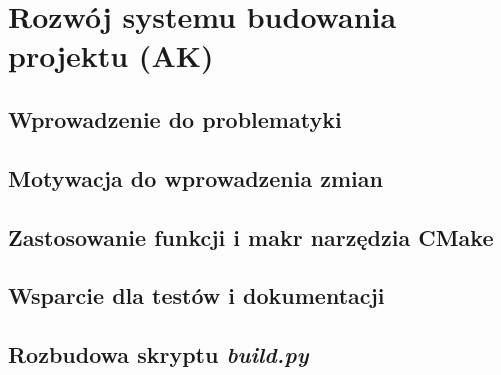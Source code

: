 \clearpage
\section{Rozwój systemu budowania projektu (AK)}
\label{ch:building_project}

\subsection{Wprowadzenie do problematyki}

\subsection{Motywacja do wprowadzenia zmian}

\subsection{Zastosowanie funkcji i makr narzędzia CMake}

\subsection{Wsparcie dla testów i dokumentacji}

\subsection{Rozbudowa skryptu \emph{build.py}}

